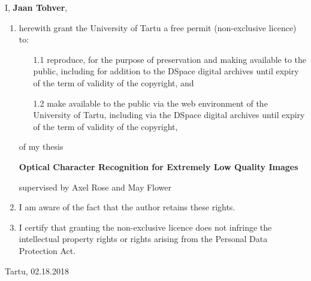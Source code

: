 \documentclass[12pt]{article}
\begin{document}
I, \textbf{Jaan Tohver},

\begin{enumerate}
\item
herewith grant the University of Tartu a free permit (non-exclusive licence) to:
\begin{enumerate}
\item[1.1]
reproduce, for the purpose of preservation and making available to the public, including for addition to the DSpace digital archives until expiry of the term of validity of the copyright, and
\item[1.2]
make available to the public via the web environment of the University of Tartu, including via the DSpace digital archives until expiry of the term of validity of the copyright,
\end{enumerate}

of my thesis

\textbf{Optical Character Recognition for Extremely Low Quality Images}

supervised by Axel Rose and May Flower

\item
I am aware of the fact that the author retains these rights.
\item
I certify that granting the non-exclusive licence does not infringe the intellectual property rights or rights arising from the Personal Data Protection Act. 
\end{enumerate}

\noindent
Tartu, 02.18.2018
\end{document}
